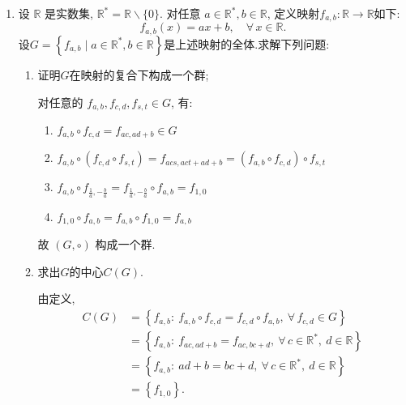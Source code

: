\begin{enumerate}
\item 设 $\mathbb{R}$ 是实数集, $\mathbb{R}^{*} = \mathbb{R}\backslash\{0\}$.
对任意 $a \in \mathbb{R}^{*}, b \in \mathbb{R}$, 定义映射$f_{a,b}: \mathbb{R} \rightarrow \mathbb{R}$如下:
\[f_{a,b}(x) = ax+b,\quad\forall\, x \in \mathbb{R}.\]
设$G = \left\{f_{a,b} \mid a \in \mathbb{R}^{*}, b \in \mathbb{R}\right\}$是上述映射的全体.求解下列问题:
\begin{enumerate}
\item[(1)] 证明$G$在映射的复合下构成一个群;
\begin{solution}
    对任意的 $f_{a,b},f_{c,d},f_{s,t}\in G$, 有: 
    \begin{enumerate}
        \item[(i)]
        $f_{a,b}\circ f_{c,d}=f_{ac,ad+b}\in G$
        \item[(ii)]
        $f_{a,b} \circ \left( f_{c,d} \circ f_{s,t} \right)  = f_{acs,act+ad+b} = \left( f_{a,b} \circ  f_{c,d} \right) \circ f_{s,t}$
        \item[(iii)]
        $f_{a,b} \circ f_{\frac{1}{a},-\frac{b}{a}} = f_{\frac{1}{a},-\frac{b}{a}} \circ f_{a,b} = f_{1,0}$
        \item[(iv)]
        $f_{1,0} \circ f_{a,b} = f_{a,b} \circ f_{1,0} = f_{a,b}$
    \end{enumerate}
    故 $(G,\circ)$ 构成一个群. 
\end{solution}
\item[(2)] 求出$G$的中心$C(G)$.
\begin{solution}
    由定义, 
    \begin{align*}
        C(G) &= \left\{ f_{a,b}:\ f_{a,b} \circ f_{c,d} = f_{c,d} \circ f_{a,b},\ \forall\, f_{c,d} \in G \right\} \\
        &= \left\{ f_{a,b}:\ f_{ac,ad+b} = f_{ac,bc+d},\ \forall\, c \in \mathbb{R}^*,\ d\in \mathbb{R} \right\} \\
        &= \left\{ f_{a,b}:\ ad+b=bc+d,\ \forall\, c \in \mathbb{R}^*,\ d \in \mathbb{R} \right\} \\
        &= \left\{f_{1,0}\right\}. 
    \end{align*}
\end{solution}
\end{enumerate}

\end{enumerate}

